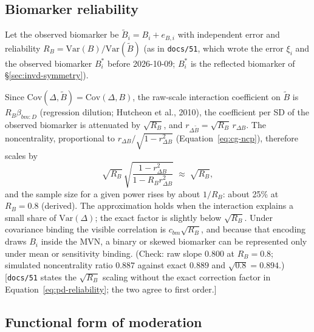 \documentclass[11pt]{article}
\newcommand{\note}[1]{\textcolor{blue!60!black}{\small [#1]}}
\newcommand{\code}[1]{\texttt{#1}}
\begin{document}
\subsection{Biomarker reliability}

Let the observed biomarker be $\tilde B_i = B_i + e_{B,i}$ with
independent error and reliability $R_B = \mathrm{Var}(B)/
\mathrm{Var}(\tilde B)$ (as in \code{docs/51}, which wrote the error
$\xi_i$ and the observed biomarker $B^{\ast}_i$ before 2026-10-09;
$B^{\ast}_i$ is the reflected biomarker of \S\ref{sec:invd-symmetry}).

Since $\mathrm{Cov}(\Delta, \tilde B) = \mathrm{Cov}(\Delta, B)$, the
raw-scale interaction coefficient on $\tilde B$ is $R_B\beta_{bm:D}$
(regression dilution; Hutcheon et al., 2010), the coefficient per SD
of the observed biomarker is attenuated by $\sqrt{R_B}$, and
$r_{\Delta \tilde B} = \sqrt{R_B}\,r_{\Delta B}$. The
noncentrality, proportional to $r_{\Delta B}/\sqrt{1-r_{\Delta B}^2}$
(Equation~\eqref{eq:cg-ncp}), therefore
scales by
\begin{equation}
\sqrt{R_B}\,\sqrt{\frac{1 - r_{\Delta B}^2}{1 - R_Br_{\Delta B}^2}}
\;\approx\; \sqrt{R_B},
\label{eq:pd-reliability}
\end{equation}
and the sample size for a given power rises by about $1/R_B$: about
25\% at $R_B = 0.8$ (derived). The approximation holds when the
interaction explains a small share of $\mathrm{Var}(\Delta)$; the
exact factor is slightly below $\sqrt{R_B}$. Under covariance binding
the visible correlation is $c_{bm}\sqrt{R_B}$, and because that
encoding draws $B_i$ inside the MVN, a binary or skewed biomarker can
be represented only under mean or sensitivity binding. (Check: raw
slope $0.800$ at $R_B = 0.8$; simulated noncentrality ratio $0.887$
against exact $0.889$ and $\sqrt{0.8} = 0.894$.) \note{\code{docs/51}
states the $\sqrt{R_B}$ scaling without the exact correction factor
in Equation~\eqref{eq:pd-reliability}; the two agree to first order.}

\subsection{Functional form of moderation}
\end{document}
